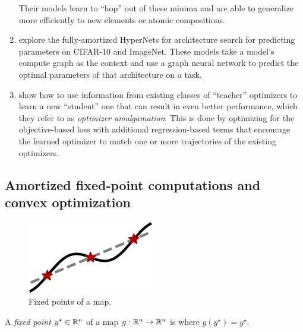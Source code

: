 \documentclass[twoside,11pt]{article}
\begin{document}
\begin{enumerate}
  Their models learn to ``hop'' out of these minima
  and are able to generalize more efficiently to
  new elements or atomic compositions.
\item \citet{zhang2018graph,knyazev2021parameter} explore
  the fully-amortized HyperNets for architecture search
  for predicting parameters on CIFAR-10 and ImageNet.
  These models take a model's compute graph as the
  context and use a graph neural network to predict
  the optimal parameters of that architecture on a task.
\item \citet{huang2022optimizer} show how to use
  information from existing classes of ``teacher''
  optimizers to learn a new ``student'' one that
  can result in even better performance,
  which they refer to as \emph{optimizer amalgamation}.
  This is done by optimizing for the objective-based
  loss with additional regression-based terms that
  encourage the learned optimizer to match one or
  more trajectories of the existing optimizers.
\end{enumerate}

\newpage
\subsection{Amortized fixed-point computations and convex optimization}
\label{sec:apps:convex}

\begin{figure}
\vspace{-3mm}
\includegraphics[width=\linewidth]{fig/fp.pdf}
\caption{Fixed points of a map.}
\label{fig:fp}
\end{figure}

\begin{definition}
  A \emph{fixed point} $y^\star\in\mathbb{R}^n$ of a map
  $g:\mathbb{R}^n\rightarrow\mathbb{R}^n$ is where $g(y^\star) = y^\star$.
  \label{def:fixed}
\end{definition}
\end{document}
